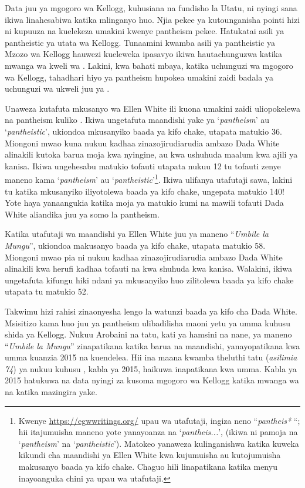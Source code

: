 Data juu ya mgogoro wa Kellogg, kuhusiana na fundisho la Utatu, ni nyingi sana ikiwa  linahesabiwa katika mlinganyo huo. Njia pekee ya kutounganisha pointi hizi ni kupuuza  na kuelekeza umakini kwenye pantheism pekee. Hatukatai asili ya pantheistic ya utata wa Kellogg. Tunaamini kwamba asili ya pantheistic ya Mzozo wa Kellogg hauwezi kueleweka ipasavyo ikiwa hautachunguzwa katika mwanga wa kweli wa . Lakini, kwa bahati mbaya, katika uchunguzi wa mgogoro wa Kellogg, tahadhari hiyo ya pantheism hupokea umakini zaidi badala ya uchunguzi wa ukweli juu ya .


Unaweza kutafuta mkusanyo wa Ellen White ili kuona umakini zaidi uliopokelewa na pantheism kuliko . Ikiwa ungetafuta maandishi yake ya ‘\textit{pantheism}’ au ‘\textit{pantheistic}’, ukiondoa mkusanyiko baada ya kifo chake, utapata matukio 36. Miongoni mwao kuna nukuu kadhaa zinazojirudiarudia ambazo Dada White alinakili kutoka barua moja kwa nyingine, au kwa ushuhuda maalum kwa ajili ya kanisa. Ikiwa ungehesabu matukio tofauti utapata nukuu 12 tu tofauti zenye maneno kama ‘\textit{pantheism}’ au ‘\textit{pantheistic}’\footnote{Kwenye \href{https://egwwritings.org/}{https://egwwritings.org/} upau wa utafutaji, ingiza neno “\textit{pantheis*} “; hii itajumuisha maneno yote yanayoanza na ‘\textit{pantheis...}’, (ikiwa ni pamoja na ‘\textit{pantheism}’ na ‘\textit{pantheistic}’). Matokeo yanaweza kulinganishwa katika kuweka kikundi cha maandishi ya Ellen White kwa kujumuisha au kutojumuisha makusanyo baada ya kifo chake. Chaguo hili linapatikana katika menyu inayoanguka chini ya upau wa utafutaji.}. Ikiwa ulifanya utafutaji sawa, lakini tu katika mkusanyiko iliyotolewa baada ya kifo chake, ungepata matukio 140! Yote haya yanaangukia katika moja ya matukio kumi na mawili tofauti Dada White aliandika juu ya somo la pantheism.


Katika utafutaji wa maandishi ya Ellen White juu ya maneno “\textit{Umbile la Mungu}”, ukiondoa makusanyo baada ya kifo chake, utapata matukio 58. Miongoni mwao pia ni nukuu kadhaa zinazojirudiarudia ambazo Dada White alinakili kwa herufi kadhaa tofauti na kwa shuhuda kwa kanisa. Walakini, ikiwa ungetafuta kifungu hiki ndani ya mkusanyiko huo zilitolewa baada ya kifo chake utapata tu matukio 52.


Takwimu hizi rahisi zinaonyesha lengo la watunzi baada ya kifo cha Dada White. Msisitizo kama huo juu ya pantheism ulibadilisha maoni yetu ya umma kuhusu shida ya Kellogg. Nukuu Arobaini na tatu, kati ya hamsini na nane, ya maneno “\textit{Umbile la Mungu}” zinapatikana katika barua na maandishi, yanayopatikana kwa umma kuanzia 2015 na kuendelea. Hii ina maana kwamba theluthi tatu (\textit{asilimia 74}) ya nukuu kuhusu , kabla ya 2015, haikuwa inapatikana kwa umma. Kabla ya 2015 hatukuwa na data nyingi za kusoma mgogoro wa Kellogg katika mwanga wa  na katika mazingira yake.



